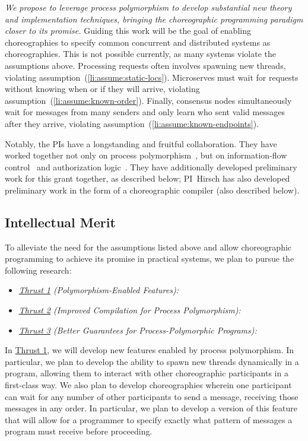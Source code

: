 \emph{We propose to leverage process polymorphism to develop substantial new theory and implementation techniques, bringing the choreographic programming paradigm closer to its promise.}
Guiding this work will be the goal of enabling choreographies to specify common concurrent and distributed systems as choreographies.
This is not possible currently, as many systems violate the assumptions above.
Processing requests often involves spawning new threads, violating assumption~(\ref{li:assume:static-locs}).
Microserves must wait for requests without knowing when or if they will arrive, violating assumption~(\ref{li:assume:known-order}).
Finally, consensus nodes simultaneously wait for messages from many senders
and only learn who sent valid messages after they arrive,
violating assumption~(\ref{li:assume:known-endpoints}).

Notably, the PIs have a longstanding and fruitful collaboration.
They have worked together not only on process polymorphism~\cite{SamuelsonHC25}, but on information-flow control~\cite{SilverHCHZ23,HirschC21} and authorization logic~\cite{HirschACAT20}.
They have additionally developed preliminary work for this grant together, as described below; PI~Hirsch has also developed preliminary work in the form of a choreographic compiler (also described below).

\subsection{Intellectual Merit}

To alleviate the need for the assumptions listed above and allow choreographic programming to achieve its promise in practical systems, we plan to pursue the following research:
\begin{itemize}
  \item \textit{\hyperref[sec:t1]{Thrust 1} (Polymorphism-Enabled Features):}
  \item \textit{\hyperref[sec:t2]{Thrust 2} (Improved Compilation for Process Polymorphism):}
  \item \textit{\hyperref[sec:t3]{Thrust 3} (Better Guarantees for Process-Polymorphic Programs):}
\end{itemize}


In \hyperref[sec:t1]{Thrust 1}, we will develop new features enabled by process polymorphism.
In particular, we plan to develop the ability to spawn new threads dynamically in a program, allowing them to interact with other choreographic participants in a first-class way.
We also plan to develop choreographies wherein one participant can wait for any number of other participants to send a message, receiving those messages in any order.
In particular, we plan to develop a version of this feature that will allow for a programmer to specify exactly what pattern of messages a program must receive before proceeding.

